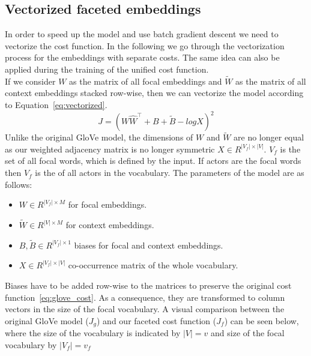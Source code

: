 \subsection{Vectorized faceted embeddings}
In order to speed up the model and use batch gradient descent we need to vectorize the cost function. In the following we go through the vectorization process for the embeddings with separate costs. The same idea can also be applied during the training of the unified cost function.\\
If we consider $W$ as the matrix of all focal embeddings and $\tilde{ W }$ as the matrix of all context embeddings stacked row-wise, then we can vectorize the model according to Equation~\ref{eq:vectorized}. 
\begin{equation}
J=(W \hat{  W }^{ \top } +B+\tilde{ B } -log{ X })^{ 2 }
\label{eq:vectorized}
\end{equation}
Unlike the original GloVe model, the dimensions of  $W$ and $\tilde{ W } $ are no longer equal as our weighted adjacency matrix is no longer symmetric $X \in R^{|V_f|\times |V|} $.  $V_f$ is the set of all focal words, which is defined by the input. If actors are the focal words then $V_f$ is the  of all actors in the vocabulary. The parameters of the model are as follows: 
\begin{itemize}
\item $W \in R^{|V_f| \times M} $ for focal embeddings.
 \item $\tilde{ W }  \in R^{|V| \times M} $ for context embeddings.
\item $B,\tilde{B} \in R^{|V_f| \times 1}$ biases for focal and context embeddings.
\item $X \in R^{|V_f|\times |V|} $ co-occurrence matrix of the whole vocabulary. 
\end{itemize}
Biases have to be added row-wise to the matrices to preserve the original cost function~\ref{eq:glove_cost}. As a consequence, they are transformed to column vectors in the size of the focal vocabulary. A visual comparison between the original GloVe model ($J_g$) and our faceted cost function ($J_f$) can be seen below, where the size of the vocabulary is indicated by $|V|=v$ and size of the focal vocabulary by $|V_f|=v_f$\\
